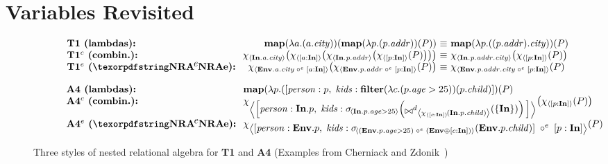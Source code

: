 \section{Variables Revisited}
\label{sec:variables}

\begin{figure*}
  \begin{center}
\begin{subfigure}[b]{0.95\linewidth}
\centering
    \begin{minipage}{0.9\linewidth}
      \centering
      \[\begin{array}{l@{\ }r@{\ \equiv\ }l}
        \textbf{T1 (lambdas):~} & \lmapop(\llambda{a}{a.\mathit{city}})(\lmapop(\llambda{p}{p.\mathit{addr}})(P)) & \lmapop(\llambda{p}{(p.\mathit{addr}).\mathit{city}})(P)\\
        \textbf{T1$^c$ (combin.):~} & \qmap{\qID.\mathit{a}.\mathit{city}}{\qmap{[a:\qID]}{\qmap{\qID.\mathit{p}.\mathit{addr}}{\qmap{[p:\qID]}{P}}}} & \qmap{\qID.\mathit{p}.\mathit{addr}.\mathit{city}}{\qmap{[p:\qID]}{P}}\\
        \textbf{T1$^e$ (\NRAEnv):~} & \qmap{\qENV.\mathit{a}.\mathit{city}\;\circ^e\;[a:\qID]}{\qmap{\qENV.\mathit{p}.\mathit{addr}\;\circ^e\;[p:\qID]}{P}} & \qmap{\qENV.\mathit{p}.\mathit{addr}.\mathit{city}\;\circ^e\;[p:\qID]}{P}\\
      \end{array}\]
    \end{minipage}
  \end{subfigure}
\begin{subfigure}[b]{0.95\linewidth}
\centering
    \begin{minipage}{0.9\linewidth}
      \centering
      \[\begin{array}{l@{\ }l}
      \textbf{A4 (lambdas):~} & \lmapop(\llambda{p}{[ \mathit{person}: p,\;\mathit{kids}: \lselop(\llambda{c}{p.\mathit{age} > 25})(p.\mathit{child}) ]}(P)\\
      \textbf{A4$^c$ (combin.):~} & \qmap{\Big[\textstyle \mathit{person}: \qID.p,\;\mathit{kids}: \qselect{\qID.p.\mathit{age} > 25}{\qdjoin{\qmap{[c:\qID]}{\qID.p.\mathit{child}}}{\{\qID\}}} \Big]}{\qmap{[p:\qID]}{P}}\\
      \textbf{A4$^e$ (\NRAEnv):~} & \qmap{\textstyle [ \mathit{person}: \qENV.p,\;\mathit{kids}: \qselect{(\qENV.p.\mathit{age} > 25)\;\circ^e\;(\qENV \oplus [c:\qID])}{\qENV.p.\mathit{child}} ]\;\circ^e\;[p:\qID]}{P}
      \end{array}\]
    \end{minipage}
  \end{subfigure}
  \end{center}
  \caption{Three styles of nested relational algebra for \textbf{T1} and \textbf{A4} (Examples from Cherniack and Zdonik~\cite{cherniack1996rule})}
  \label{figure:threenras}
\end{figure*}

